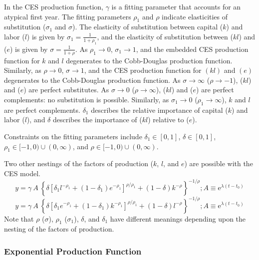 \documentclass[preprint,authoryear,12pt]{elsarticle}\usepackage[]{graphicx}\usepackage[]{color}
\begin{document}
In the CES production function, 
$\gamma$ is a fitting parameter that accounts for an atypical first year. 
The fitting parameters $\rho_1$ and $\rho$ indicate elasticities 
of substitution ($\sigma_1$ and $\sigma$).
The elasticity of substitution 
between capital ($k$) and labor ($l$) is given by 
$\sigma_1 = \frac{1}{1+\rho_1}$, and
the elasticity of substitution between ($kl$) and ($e$) is given by 
$\sigma = \frac{1}{1+\rho}$. 
As $\rho_1 \rightarrow 0$, $\sigma_1 \rightarrow 1$,
and the embedded CES production function for $k$ and $l$ degenerates 
to the Cobb-Douglas production function.
Similarly, as $\rho \rightarrow 0$, $\sigma \rightarrow 1$,
and the CES production function for $(kl)$ and $(e)$ degenerates 
to the Cobb-Douglas production function.
As $\sigma \rightarrow \infty$ ($\rho \rightarrow -1$), 
($kl$) and ($e$) are perfect substitutes. 
As $\sigma \rightarrow 0$ ($\rho \rightarrow \infty$), 
($kl$) and ($e$) are perfect complements: 
no substitution is possible. Similarly, 
as $\sigma_1 \rightarrow 0$ ($\rho_1 \rightarrow \infty$),
$k$ and $l$ are perfect complements.
$\delta_1$ describes the relative importance of capital ($k$)
and labor ($l$), and
$\delta$ describes the importance of ($kl$) relative to ($e$).

Constraints on the fitting parameters include 
$\delta_1 \in [0,1]$,
$\delta \in [0,1]$,
$\rho_1 \in [-1,0) \cup (0,\infty)$, and
$\rho \in [-1,0) \cup (0,\infty)$. 

Two other nestings of the factors of production ($k$, $l$, and $e$)
are possible with the CES model.
%
\begin{equation} \label{eq:CESlek}
  y = \gamma \: A \: \left\{\delta \left[\delta_1 l^{-\rho_1} 
      + (1-\delta_1) e^{-\rho_1} \right]^{\rho/\rho_1} 
      + (1-\delta) k^{-\rho} \right\}^{-1/\rho}; 
      A \equiv \mathrm{e}^{\lambda (t-t_0)}
\end{equation}
%
\begin{equation} \label{eq:CESekl}
  y = \gamma \: A \: \left\{\delta \left[\delta_1 e^{-\rho_1} 
      + (1-\delta_1) k^{-\rho_1} \right]^{\rho/\rho_1} 
      + (1-\delta) l^{-\rho} \right\}^{-1/\rho}; 
      A \equiv \mathrm{e}^{\lambda (t-t_0)}
\end{equation}
% 
Note that $\rho$ ($\sigma$), $\rho_1$ ($\sigma_1$), $\delta$, and $\delta_1$ have different
meanings depending upon the nesting of the factors of production.


\subsubsection{Exponential Production Function} 
\label{sec:exp}
\end{document}
